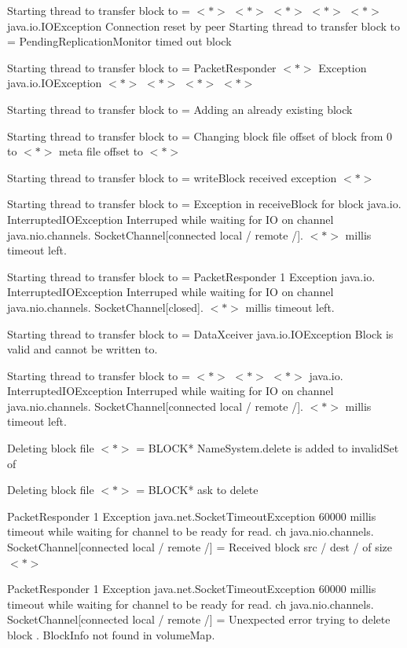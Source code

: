 \documentclass[12pt,a4paper]{article}
\begin{document}
	\noindent Starting thread to transfer block to = $<*>$ $<*>$ $<*>$ $<*>$ $<*>$ java.io.IOException Connection reset by peer
	Starting thread to transfer block to = PendingReplicationMonitor timed out block
	
	\noindent Starting thread to transfer block to = PacketResponder $<*>$ Exception java.io.IOException $<*>$ $<*>$ $<*>$ $<*>$
	
	\noindent Starting thread to transfer block to = Adding an already existing block
	
	\noindent Starting thread to transfer block to = Changing block file offset of block from 0 to $<*>$ meta file offset to $<*>$
	
	\noindent Starting thread to transfer block to = writeBlock received exception $<*>$
	
	\noindent Starting thread to transfer block to = Exception in receiveBlock for block java.io. InterruptedIOException Interruped while waiting for IO on channel java.nio.channels. SocketChannel[connected local / remote /]. $<*>$ millis timeout left.
	
	\noindent Starting thread to transfer block to = PacketResponder 1 Exception java.io. InterruptedIOException Interruped while waiting for IO on channel java.nio.channels. SocketChannel[closed]. $<*>$ millis timeout left.
	
	\noindent Starting thread to transfer block to = DataXceiver java.io.IOException Block is valid and cannot be written to.
	
	\noindent Starting thread to transfer block to = $<*>$ $<*>$ $<*>$ java.io. InterruptedIOException Interruped while waiting for IO on channel java.nio.channels. SocketChannel[connected local / remote /]. $<*>$ millis timeout left.
	
	\noindent Deleting block file $<*>$ = BLOCK* NameSystem.delete is added to invalidSet of
	
	\noindent Deleting block file $<*>$ = BLOCK* ask to delete
	
	\noindent PacketResponder 1 Exception java.net.SocketTimeoutException 60000 millis timeout while waiting for channel to be ready for read. ch java.nio.channels. SocketChannel[connected local / remote /] = Received block src / dest / of size $<*>$
	
	\noindent PacketResponder 1 Exception java.net.SocketTimeoutException 60000 millis timeout while waiting for channel to be ready for read. ch 
	java.nio.channels. SocketChannel[connected local / remote /] = Unexpected error trying to delete block . BlockInfo not found in volumeMap.
	
\end{document}
